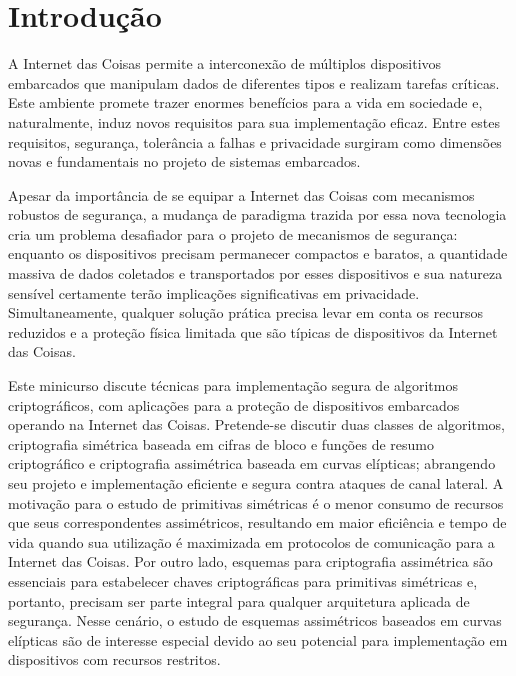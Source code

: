 \section{Introdução}

A Internet das Coisas permite a interconexão de múltiplos dispositivos embarcados que manipulam dados de diferentes tipos e realizam tarefas críticas. Este ambiente promete trazer enormes benefícios para a vida em sociedade e, naturalmente, induz novos requisitos para sua implementação eficaz. Entre estes requisitos, segurança, tolerância a falhas e privacidade surgiram como dimensões novas e fundamentais no projeto de sistemas embarcados.

Apesar da importância de se equipar a Internet das Coisas com mecanismos robustos de segurança, a mudança de paradigma trazida por essa nova tecnologia cria um problema desafiador para o projeto de mecanismos de segurança: enquanto os dispositivos precisam permanecer compactos e baratos, a quantidade massiva de dados coletados e transportados por esses dispositivos e sua natureza sensível certamente terão implicações significativas em privacidade. Simultaneamente, qualquer solução prática precisa levar em conta os recursos reduzidos e a proteção física limitada que são típicas de dispositivos da Internet das Coisas.

Este minicurso discute técnicas para implementação segura de algoritmos criptográficos, com aplicações para a proteção de dispositivos embarcados operando na Internet das Coisas. Pretende-se discutir duas classes de algoritmos, criptografia simétrica baseada em cifras de bloco e funções de resumo criptográfico e criptografia assimétrica baseada em curvas elípticas; abrangendo seu projeto e implementação eficiente e segura contra ataques de canal lateral. A motivação para o estudo de primitivas simétricas é o menor consumo de recursos que seus correspondentes assimétricos, resultando em maior eficiência e tempo de vida quando sua utilização é maximizada em protocolos de comunicação para a Internet das Coisas. Por outro lado, esquemas para criptografia assimétrica são essenciais para estabelecer chaves criptográficas para primitivas simétricas e, portanto, precisam ser parte integral para qualquer arquitetura aplicada de segurança. Nesse cenário, o estudo de esquemas assimétricos baseados em curvas elípticas são de interesse especial devido ao seu potencial para implementação em dispositivos com recursos restritos.




